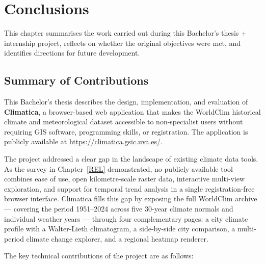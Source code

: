 \chapter{Conclusions}\label{CONC}

This chapter summarises the work carried out during this Bachelor's thesis +
internship project, reflects on whether the original objectives were met, and
identifies directions for future development.

\section{Summary of Contributions}\label{CONC_SUMMARY}

This Bachelor's thesis describes the design, implementation, and evaluation of
\textbf{Climatica}, a browser-based web application that makes the WorldClim
historical climate and meteorological dataset accessible to non-specialist users
without requiring GIS software, programming skills, or registration. The
application is publicly available at \url{https://climatica.gsic.uva.es/}.

The project addressed a clear gap in the landscape of existing climate data
tools. As the survey in Chapter~\ref{REL} demonstrated, no publicly available
tool combines ease of use, open kilometre-scale raster data, interactive
multi-view exploration, and support for temporal trend analysis in a single
registration-free browser interface. Climatica fills this gap by exposing the
full WorldClim archive --- covering the period 1951--2024 across five 30-year
climate normals and individual weather years --- through four complementary
pages: a city climate profile with a Walter-Lieth climatogram, a side-by-side
city comparison, a multi-period climate change explorer, and a regional heatmap
renderer.

The key technical contributions of the project are as follows:

